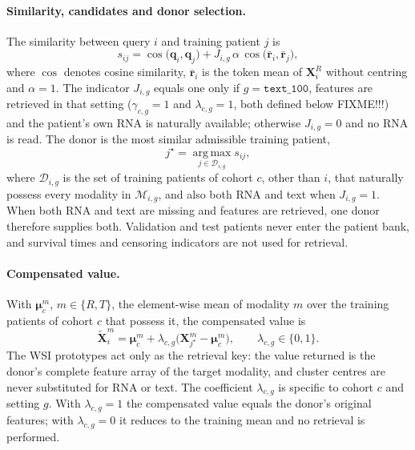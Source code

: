\documentclass[pdflatex,sn-vancouver-num]{sn-jnl}
\begin{document}
\paragraph{Similarity, candidates and donor selection.}
The similarity between query $i$ and training patient $j$ is
\begin{equation}
  s_{ij}=\cos\bigl(\mathbf{q}_i,\mathbf{q}_j\bigr)
        +J_{i,g}\,\alpha\,\cos\bigl(\bar{\mathbf{r}}_i,\bar{\mathbf{r}}_j\bigr),
  \label{eq:pr-sim}
\end{equation}
where $\cos$ denotes cosine similarity, $\bar{\mathbf{r}}_i$ is the token mean
of $\mathbf{X}_i^{R}$ without centring and $\alpha=1$. The indicator $J_{i,g}$
equals one only if $g=\texttt{text\_100}$, features are retrieved in that
setting ($\gamma_{c,g}=1$ and $\lambda_{c,g}=1$, both defined below FIXME!!!) and the
patient's own RNA is naturally available; otherwise $J_{i,g}=0$ and no RNA is
read. The donor is the most similar admissible training patient,
\begin{equation}
  j^{\star}=\operatorname*{arg\,max}_{j\in\mathcal{D}_{i,g}}s_{ij},
  \label{eq:pr-top1}
\end{equation}
where $\mathcal{D}_{i,g}$ is the set of training patients of cohort $c$, other
than $i$, that naturally possess every modality in $\mathcal{M}_{i,g}$, and
also both RNA and text when $J_{i,g}=1$. When both RNA and text are missing
and features are retrieved, one donor therefore supplies both. Validation and
test patients never enter the patient bank, and survival times and censoring
indicators are not used for retrieval.

\paragraph{Compensated value.}
With $\boldsymbol{\mu}_c^{m}$, $m\in\{R,T\}$, the element-wise mean of
modality $m$ over the training patients of cohort $c$ that possess it, the
compensated value is
\begin{equation}
  \widetilde{\mathbf{X}}_i^{m}
  =\boldsymbol{\mu}_c^{m}
   +\lambda_{c,g}\bigl(\mathbf{X}_{j^{\star}}^{m}-\boldsymbol{\mu}_c^{m}\bigr),
  \qquad \lambda_{c,g}\in\{0,1\}.
  \label{eq:pr-shrink}
\end{equation}
The WSI prototypes act only as the retrieval key: the value returned is the
donor's complete feature array of the target modality, and cluster centres are
never substituted for RNA or text. The coefficient $\lambda_{c,g}$ is specific
to cohort $c$ and setting $g$. With $\lambda_{c,g}=1$ the compensated value
equals the donor's original features; with $\lambda_{c,g}=0$ it reduces to the
training mean and no retrieval is performed.
\end{document}
